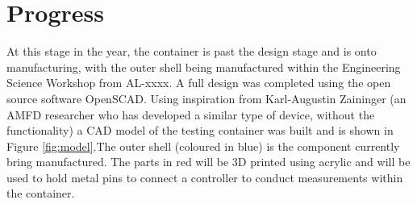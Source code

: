 \documentclass[a4paper,11pt]{article}
\begin{document}
\section{Progress}
At this stage in the year, the container is past the design stage and is onto manufacturing, with the outer shell being manufactured within the Engineering Science Workshop from AL-xxxx. A full design was completed using the open source software OpenSCAD. Using inspiration from Karl-Augustin Zaininger (an AMFD researcher who has developed a similar type of device, without the functionality) a CAD model of the testing container was built and is shown in Figure \ref{fig:model}.The outer shell (coloured in blue) is the component currently bring manufactured. The parts in red will be 3D printed using acrylic and will be used to hold metal pins to connect a controller to conduct measurements within the container.  \\ 
\end{document}
